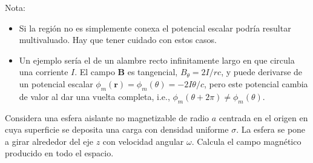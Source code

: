 \documentclass{exam}
\begin{document}
\begin{questions}
  Nota:
  \begin{itemize}
  \item Si la región no es simplemente conexa el potencial escalar
    podría resultar multivaluado. Hay que tener cuidado con estos casos.
  \item Un ejemplo sería el de un alambre recto infinitamente largo en
    que circula una corriente $I$. El campo $\bm B$ es tangencial,
    $B_\theta=2I/rc$, y puede derivarse de un potencial escalar
    $\phi_m(\bm r)=\phi_m(\theta)=-2I\theta/c$, pero este potencial
    cambia de valor al dar una vuelta completa, i.e.,
    $\phi_m(\theta+2\pi)\ne\phi_m(\theta)$.
  \end{itemize}


\question Considera una esfera aislante no magnetizable de radio $a$ centrada en el
  origen en cuya superficie se deposita una carga con densidad
  uniforme $\sigma$. La esfera se pone a girar alrededor del eje $z$
  con velocidad angular $\omega$. Calcula el campo magnético producido
  en todo el espacio.


\end{questions}
\end{document}
